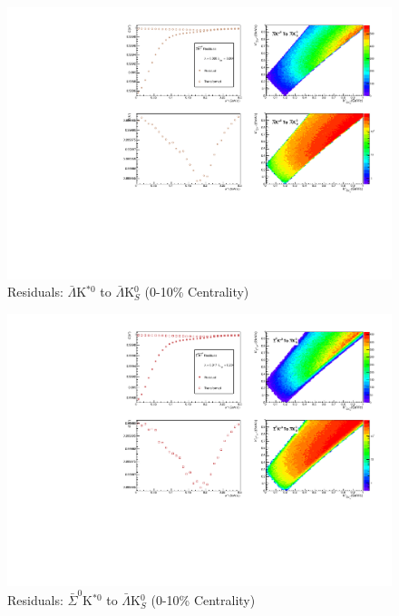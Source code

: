 \documentclass[../AnalysisNoteJBuxton.tex]{subfiles}
\begin{document}
\begin{figure}[h]
  \centering
  \includegraphics[width=\textwidth]{9_AdditionalFigures/Figures/Residuals/ALamK0/Residuals_ALamK0_0010_ALamKSt0ToALamK0_MomResCrctn_NonFlatBgdCrctn_SingleLamParam_ResidualsIncluded_UsingCoulombOnlyInterpCfs.pdf}
  \caption[Residuals: $\bar{\Lambda}$K$^{*0}$ to $\bar{\Lambda}$K$^{0}_{S}$ (0-10\% Centrality)]{Residuals: $\bar{\Lambda}$K$^{*0}$ to $\bar{\Lambda}$K$^{0}_{S}$ (0-10\% Centrality)}
  \label{fig:Res_ALamK0_0010_ALamKSt0}
\end{figure}


\begin{figure}[h]
  \centering
  \includegraphics[width=\textwidth]{9_AdditionalFigures/Figures/Residuals/ALamK0/Residuals_ALamK0_0010_ASigma0KSt0ToALamK0_MomResCrctn_NonFlatBgdCrctn_SingleLamParam_ResidualsIncluded_UsingCoulombOnlyInterpCfs.pdf}
  \caption[Residuals: $\bar{\Sigma}^{0}$K$^{*0}$ to $\bar{\Lambda}$K$^{0}_{S}$ (0-10\% Centrality)]{Residuals: $\bar{\Sigma}^{0}$K$^{*0}$ to $\bar{\Lambda}$K$^{0}_{S}$ (0-10\% Centrality)}
  \label{fig:Res_ALamK0_0010_ASig0KSt0}
\end{figure}
\end{document}
